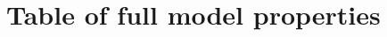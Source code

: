 \documentclass[english,12pt,a4paper,pdftex,elec,utf8]{aaltothesis}
\begin{document}






































\clearpage

{}














\clearpage
\thesisappendix

\section{Table of full model properties\label{app:full-model-table}}

    




\end{document}
